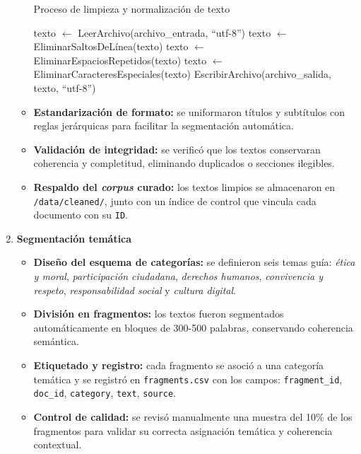 \begin{enumerate}
\begin{itemize}
                        \begin{algorithm}[H]
                              \caption{Proceso de limpieza y normalización de texto}
                              \label{alg:limpiar-texto}
                              \begin{algorithmic}[1]
                                    \State texto $\gets$ LeerArchivo(archivo\_entrada, ``utf-8'')
                                    \State texto $\gets$ EliminarSaltosDeLínea(texto)
                                    \State texto $\gets$ EliminarEspaciosRepetidos(texto)
                                    \State texto $\gets$ EliminarCaracteresEspeciales(texto)
                                    \State EscribirArchivo(archivo\_salida, texto, ``utf-8'')
                                    \EndProcedure
                              \end{algorithmic}
                        \end{algorithm}

                  \item \textbf{Estandarización de formato:} se uniformaron títulos y subtítulos con reglas jerárquicas para facilitar la segmentación automática.
                  \item \textbf{Validación de integridad:} se verificó que los textos conservaran coherencia y completitud, eliminando duplicados o secciones ilegibles.
                  \item \textbf{Respaldo del \textit{corpus} curado:} los textos limpios se almacenaron en \texttt{/data/cleaned/}, junto con un índice de control que vincula cada documento con su \texttt{ID}.
            \end{itemize}

      \item \textbf{Segmentación temática}
            \begin{itemize}
                  \item \textbf{Diseño del esquema de categorías:} se definieron seis temas guía: \textit{ética y moral}, \textit{participación ciudadana}, \textit{derechos humanos}, \textit{convivencia y respeto}, \textit{responsabilidad social} y \textit{cultura digital}.
                  \item \textbf{División en fragmentos:} los textos fueron segmentados automáticamente en bloques de 300-500 palabras, conservando coherencia semántica.
                  \item \textbf{Etiquetado y registro:} cada fragmento se asoció a una categoría temática y se registró en \texttt{fragments.csv} con los campos:
                        \texttt{fragment\_id}, \texttt{doc\_id}, \texttt{category}, \texttt{text}, \texttt{source}.
                  \item \textbf{Control de calidad:} se revisó manualmente una muestra del 10\% de los fragmentos para validar su correcta asignación temática y coherencia contextual.
            \end{itemize}


\end{enumerate}
